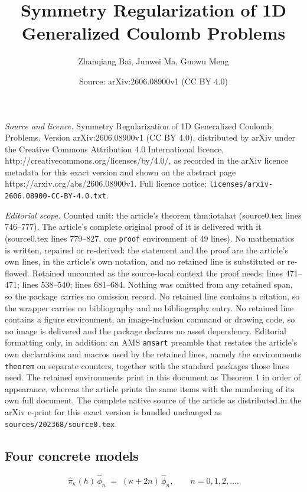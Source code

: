 \documentclass[10pt,a4paper]{amsart}
\title{Symmetry Regularization of 1D Generalized Coulomb Problems}
\author{Zhanqiang Bai, Junwei Ma, Guowu Meng}
\date{Source: arXiv:2606.08900v1 (CC BY 4.0)}
\begin{document}
\maketitle

\noindent\emph{Source and licence.} Symmetry Regularization of 1D Generalized Coulomb Problems. Version arXiv:2606.08900v1 (CC BY 4.0), distributed by arXiv under the Creative Commons Attribution 4.0 International licence, http://creativecommons.org/licenses/by/4.0/, as recorded in the arXiv licence metadata for this exact version and shown on the abstract page https://arxiv.org/abs/2606.08900v1. Full licence notice: \texttt{licenses/arxiv-2606.08900-CC-BY-4.0.txt}.\par\smallskip

\noindent\textit{Editorial scope.} Counted unit: the article's theorem thm:iotahat (source0.tex lines 746--777). The article's complete original proof of it is delivered with it (source0.tex lines 779--827, one \texttt{proof} environment of 49 lines). No mathematics is written, repaired or re-derived: the statement and the proof are the article's own lines, in the article's own notation, and no retained line is substituted or re-flowed.  Retained uncounted as the source-local context the proof needs: lines 471--471; lines 538--540; lines 681--684.  Nothing was omitted from any retained span, so the package carries no omission record.  No retained line contains a citation, so the wrapper carries no bibliography and no bibliography entry.  No retained line contains a figure environment, an image-inclusion command or drawing code, so no image is delivered and the package declares no asset dependency.  Editorial formatting only, in addition: an AMS \texttt{amsart} preamble that restates the article's own declarations and macros used by the retained lines, namely the environments \texttt{theorem} on separate counters, together with the standard packages those lines need.  The retained environments print in this document as Theorem 1 in order of appearance, whereas the article prints the same items with the numbering of its own full document.  The complete native source of the article as distributed in the arXiv e-print for this exact version is bundled unchanged as \texttt{sources/202368/source0.tex}.
\subsection{Four concrete models}\label{ssec:four-models}

\begin{equation}\label{eq:hatphin-eigen}
  \hat\pi_{\kappa}(h)\,\hat\phi_{n}\;=\;(\kappa+2n)\,\hat\phi_{n},\qquad n=0,1,2,\ldots.
\end{equation}
\end{document}
